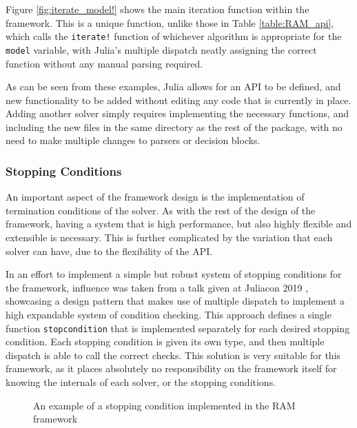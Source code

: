 Figure \ref{fig:iterate_model!} shows the main iteration function within the framework. This is a unique function, unlike those in Table \ref{table:RAM_api}, which calls the \texttt{iterate!} function of whichever algorithm is appropriate for the \texttt{model} variable, with Julia's multiple dispatch neatly assigning the correct function without any manual parsing required. 

As can be seen from these examples, Julia allows for an API to be defined, and new functionality to be added without editing any code that is currently in place. Adding another solver simply requires implementing the necessary functions, and including the new files in the same directory as the rest of the package, with no need to make multiple changes to parsers or decision blocks.

\subsubsection{Stopping Conditions}\label{subsub:stop}
An important aspect of the framework design is the implementation of termination conditions of the solver. As with the rest of the design of the framework, having a system that is high performance, but also highly flexible and extensible is necessary. This is further complicated by the variation that each solver can have, due to the flexibility of the API. 

In an effort to implement a simple but robust system of stopping conditions for the framework, influence was taken from a talk given at Juliacon 2019 \cite{JuliaConYouTube}, showcasing a design pattern that makes use of multiple dispatch to implement a high expandable system of condition checking. This approach defines a single function \texttt{stopcondition} that is implemented separately for each desired stopping condition. Each stopping condition is given its own type, and then multiple dispatch is able to call the correct checks. This solution is very suitable for this framework, as it places absolutely no responsibility on the framework itself for knowing the internals of each solver, or the stopping conditions. 

\begin{figure}[th]
    \centering
    
    
    \caption{An example of a stopping condition implemented in the RAM framework}
    \label{fig:stop_conditions}
\end{figure}

